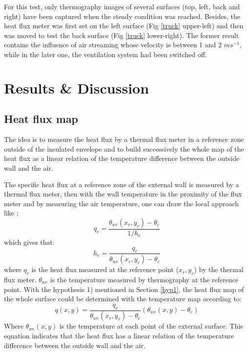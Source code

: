 For this test, only thermography images of several surfaces (top, left, back and right) have been captured when the steady condition was reached. Besides, the heat flux meter was first set on the left surface (Fig \ref{truck} upper-left) and then was moved to test the back surface (Fig \ref{truck} lower-right). The former result contains the influence of air streaming whose velocity is between 1 and 2 $ms^{-1}$, while in the later one, the ventilation system had been switched off.

\section{Results \& Discussion}
\subsection{Heat flux map}
The idea is to measure the heat flux by a thermal flux meter in a reference zone outside of the insulated envelope and to build successively the whole map of the heat flux as a linear relation of the temperature difference between the outside wall and the air.

The specific heat flux at a reference zone of the external wall is measured by a thermal flux meter, then with the wall temperature in the proximity of the flux meter and by measuring the air temperature, one can draw the local approach like \citep{rossi2009k}:
\begin{equation}
q_r = \frac{\theta_{we}(x_r,y_r)-\theta_e}{1/h_e}
\end{equation}
which gives that:
\begin{equation}
h_e = \frac{q_r}{\theta_{we}(x_r,y_r)-\theta_e}
\end{equation}
where $q_r$ is the heat flux measured at the reference point ($x_r,y_r$) by the thermal flux meter. $\theta_{we}$ is the temperature measured by thermography at the reference point. With the hypothesis 1) mentioned in Section \ref{hyp1}, the heat flux map of the whole surface could be determined with the temperature map according to:
\begin{equation}
q(x,y) = \frac{q_r}{\theta_{we}(x_r,y_r)-\theta_e}(\theta_{we}(x,y)-\theta_e)
\label{eq_q}
\end{equation}
Where $\theta_{we}(x,y)$ is the temperature at each point of the external surface. This equation indicates that the  heat flux has a linear relation of the temperature difference between the outside wall and the air.


